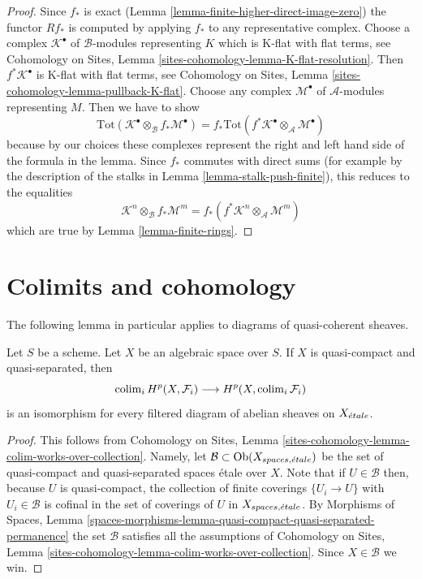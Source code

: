 \begin{proof}
Since $f_*$ is exact (Lemma \ref{lemma-finite-higher-direct-image-zero})
the functor $Rf_*$ is computed by applying $f_*$ to any representative complex.
Choose a complex $\mathcal{K}^\bullet$ of $\mathcal{B}$-modules
representing $K$ which is K-flat with flat terms, see
Cohomology on Sites, Lemma \ref{sites-cohomology-lemma-K-flat-resolution}.
Then $f^*\mathcal{K}^\bullet$ is K-flat with flat terms, see
Cohomology on Sites, Lemma \ref{sites-cohomology-lemma-pullback-K-flat}.
Choose any complex $\mathcal{M}^\bullet$ of $\mathcal{A}$-modules
representing $M$. Then
we have to show
$$
\text{Tot}(\mathcal{K}^\bullet \otimes_\mathcal{B} f_*\mathcal{M}^\bullet)
=
f_*\text{Tot}(f^*\mathcal{K}^\bullet \otimes_\mathcal{A} \mathcal{M}^\bullet)
$$
because by our choices these complexes represent the right and left hand
side of the formula in the lemma.
Since $f_*$ commutes with direct sums
(for example by the description of the stalks in
Lemma \ref{lemma-stalk-push-finite}),
this reduces to the equalities
$$
\mathcal{K}^n \otimes_\mathcal{B} f_*\mathcal{M}^m
=
f_*(f^*\mathcal{K}^n \otimes_\mathcal{A} \mathcal{M}^m)
$$
which are true by Lemma \ref{lemma-finite-rings}.
\end{proof}









\section{Colimits and cohomology}
\label{section-colimits}

\noindent
The following lemma in particular applies to diagrams of quasi-coherent
sheaves.

\begin{lemma}
\label{lemma-colimits}
Let $S$ be a scheme. Let $X$ be an algebraic space over $S$.
If $X$ is quasi-compact and quasi-separated, then
$$
\mathop{\mathrm{colim}}\nolimits_i H^p(X, \mathcal{F}_i)
\longrightarrow
H^p(X, \mathop{\mathrm{colim}}\nolimits_i \mathcal{F}_i)
$$
is an isomorphism
for every filtered diagram of abelian sheaves on $X_{\acute{e}tale}$.
\end{lemma}

\begin{proof}
This follows from
Cohomology on Sites, Lemma
\ref{sites-cohomology-lemma-colim-works-over-collection}.
Namely, let $\mathcal{B} \subset \mathop{\mathrm{Ob}}\nolimits(X_{spaces, {\acute{e}tale}})$
be the set of quasi-compact and quasi-separated spaces \'etale over $X$.
Note that if $U \in \mathcal{B}$ then, because $U$ is quasi-compact,
the collection of finite coverings $\{U_i \to U\}$ with $U_i \in \mathcal{B}$
is cofinal in the set of coverings of $U$ in $X_{spaces, {\acute{e}tale}}$. By
Morphisms of Spaces, Lemma
\ref{spaces-morphisms-lemma-quasi-compact-quasi-separated-permanence}
the set $\mathcal{B}$ satisfies all the assumptions of
Cohomology on Sites, Lemma
\ref{sites-cohomology-lemma-colim-works-over-collection}.
Since $X \in \mathcal{B}$ we win.
\end{proof}

